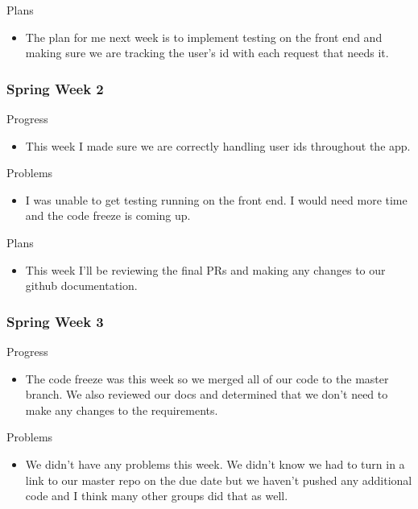         \noindent
        Plans
        \begin{itemize}
            \item The plan for me next week is to implement testing on the front end and making sure we are tracking the user's id with each request that needs it.
        \end{itemize}
    \subsubsection{Spring Week 2}
        \noindent
        Progress
        \begin{itemize}
            \item This week I made sure we are correctly handling user ids throughout the app. 
        \end{itemize}
        
        \noindent
        Problems
        \begin{itemize}
            \item I was unable to get testing running on the front end. I would need more time and the code freeze is coming up.
        \end{itemize}
        
        \noindent
        Plans
        \begin{itemize}
            \item This week I'll be reviewing the final PRs and making any changes to our github documentation.
        \end{itemize}
    \subsubsection{Spring Week 3}
        \noindent
        Progress
        \begin{itemize}
            \item The code freeze was this week so we merged all of our code to the master branch. We also reviewed our docs and determined that we don’t need to make any changes to the requirements.
        \end{itemize}
        
        \noindent
        Problems
        \begin{itemize}
            \item We didn't have any problems this week. We didn't know we had to turn in a link to our master repo on the due date but we haven't pushed any additional code and I think many other groups did that as well.
        \end{itemize}
        
